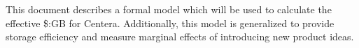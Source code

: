 This document describes a formal model which will be used to calculate the effective \$:GB for Centera. Additionally, this model is generalized to provide storage efficiency and measure marginal effects of introducing new product ideas.
